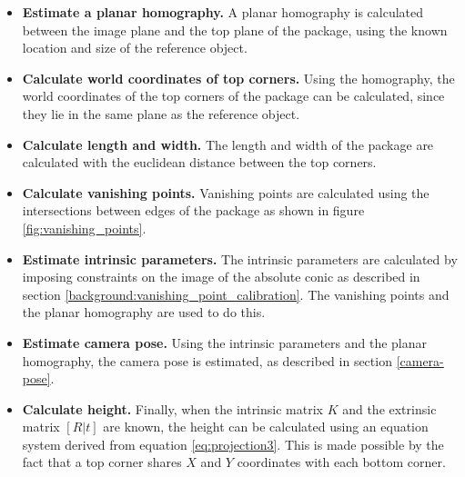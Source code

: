 \begin{itemize}
	\item \textbf{Estimate a planar homography.} A planar homography is calculated between the image plane and the top plane of the package, using the known location and size of the reference object.
	\item \textbf{Calculate world coordinates of top corners.} Using the homography, the world coordinates of the top corners of the package can be calculated, since they lie in the same plane as the reference object.
	\item \textbf{Calculate length and width.} The length and width of the package are calculated with the euclidean distance between the top corners.
	\item \textbf{Calculate vanishing points.} Vanishing points are calculated using the intersections between edges of the package as shown in figure \ref{fig:vanishing_points}.
	\item \textbf{Estimate intrinsic parameters.} The intrinsic parameters are calculated by imposing constraints on the image of the absolute conic as described in section \ref{background:vanishing_point_calibration}. The vanishing points and the planar homography are used to do this.
	\item \textbf{Estimate camera pose.} Using the intrinsic parameters and the planar homography, the camera pose is estimated, as described in section \ref{camera-pose}.
	\item \textbf{Calculate height.} Finally, when the intrinsic matrix $K$ and the extrinsic matrix $[R|t]$ are known, the height can be calculated using an equation system derived from equation \ref{eq:projection3}. This is made possible by the fact that a top corner shares $X$ and $Y$ coordinates with each bottom corner. 
\end{itemize}

